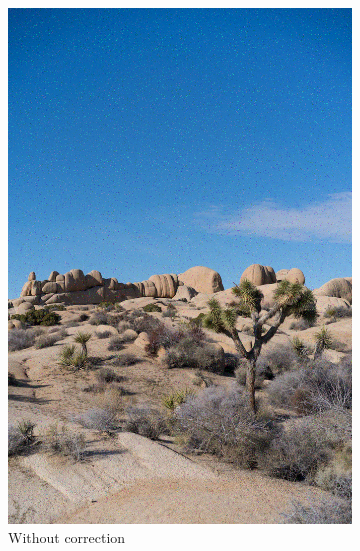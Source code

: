 \documentclass{article}
\begin{document}
\begin{figure}
\begin{subfigure}[b]{0.32\textwidth}
        \includegraphics[width=\textwidth]{../Result/cyclic-bsc-output.png}
        \caption{Without correction}
        \label{fig:image-cyclic-bsc-no-correction}
    \end{subfigure}
    \hfill
    \begin{subfigure}[b]{0.32\textwidth}
        \centering

\end{subfigure}
\end{figure}
\end{document}
